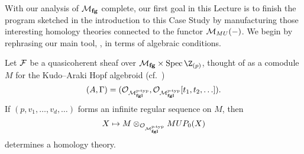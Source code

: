 With our analysis of \(\mathcal{M}_{\mathbf{fg}}\) complete, our first goal in this Lecture is to finish the program sketched in the introduction to this Case Study by manufacturing those interesting homology theories connected to the functor \(\mathcal{M}_{MU}(-)\).  We begin by rephrasing our main tool, , in terms of algebraic conditions.
\begin{theorem}
Let \(\mathcal{F}\) be a quasicoherent sheaf over \(\moduli{fg} \times \Spec \Z_{(p)}\), thought of as a comodule \(M\) for the Kudo--Araki Hopf algebroid (cf.\ ) \[(A, \Gamma) = (\mathcal{O}_{\mathcal{M}_{\mathbf{fgl}}^{\mathit{p}\text{-}\mathrm{typ}}}, \mathcal{O}_{\mathcal{M}_{\mathbf{fgl}}^{\mathit{p}\text{-}\mathrm{typ}}}[t_1, t_2, \ldots]).\]  If \((p, v_1, \ldots, v_d, \ldots)\) forms an infinite regular sequence on \(M\), then \[X \mapsto M \otimes_{\mathcal{O}_{\mathcal{M}_{\mathbf{fgl}}^{\mathit{p}\text{-}\mathrm{typ}}}} MUP_0(X)\] determines a homology theory.
\label{LEFTRealTheoremWithProof}
\end{theorem}
